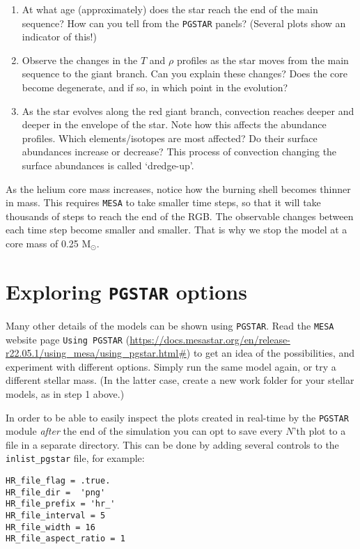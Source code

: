 \documentclass[11pt,a4paper]{article}
\begin{document}
\begin{enumerate}
\begin{enumerate}
\item At what age (approximately) does the star reach the end of the main sequence? How can you tell from the \texttt{PGSTAR} panels? (Several plots show an indicator of this!)
\item Observe the changes in the $T$ and $\rho$ profiles as the star moves from the main sequence to the giant branch. Can you explain these changes? Does the core become degenerate, and if so, in which point in the evolution? 

\item As the star evolves along the red giant branch, convection reaches deeper and deeper in the envelope of the star. Note how this affects the abundance profiles. Which elements/isotopes are most affected? Do their surface abundances increase or decrease? This process of convection changing the surface abundances is called `dredge-up'.
\end{enumerate}
As the helium core mass increases, notice how the burning shell becomes thinner in mass. This requires \texttt{MESA} to take smaller time steps, so that it will take thousands of steps to reach the end of the RGB. The observable changes between each time step become smaller and smaller. That is why we stop the model at a core mass of 0.25 M$_\odot$.

\end{enumerate}

\section{Exploring \texttt{PGSTAR} options} 

Many other details of the models can be shown using \texttt{PGSTAR}. Read the \texttt{MESA} website page \texttt{Using PGSTAR} (\url{https://docs.mesastar.org/en/release-r22.05.1/using_mesa/using_pgstar.html#}) to get an idea of the possibilities, and experiment with different options. Simply run the same model again, or try a different stellar mass. (In the latter case, create a new work folder for your stellar models, as in step 1 above.)

 In order to be able to easily inspect the plots created in
real-time by the \texttt{PGSTAR} module \emph{after} the end of the simulation you can
opt to save every $N$'th plot to a file in a separate directory. This can
be done by adding several controls to the \verb|inlist_pgstar| file, for
example:
\begin{lstlisting}
HR_file_flag = .true.
HR_file_dir =  'png'
HR_file_prefix = 'hr_'
HR_file_interval = 5
HR_file_width = 16
HR_file_aspect_ratio = 1
\end{lstlisting}
\end{document}
